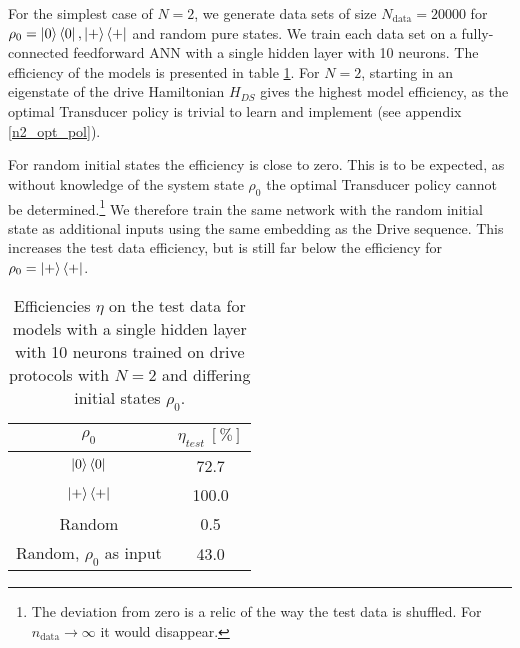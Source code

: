 For the simplest case of $N = 2$, we generate data sets of size $N_{\mathrm{data}} = 20000$ for $\rho_0 = \ket{0} \bra{0}, \ket{+} \bra{+}$ and random pure states.
We train each data set on a fully-connected feedforward ANN with a single hidden layer with 10 neurons.
The efficiency of the models is presented in table \ref{n2efftable}.
For $N = 2$, starting in an eigenstate of the drive Hamiltonian $H_{DS}$ gives the highest model efficiency, as the optimal Transducer policy is trivial to learn and implement (see appendix \ref{n2_opt_pol}).

For random initial states the efficiency is close to zero.
This is to be expected, as without knowledge of the system state $\rho_0$ the optimal Transducer policy cannot be determined.\footnote{The deviation from zero is a relic of the way the test data is shuffled. For $n_{\mathrm{data}} \to \infty$ it would disappear.}
We therefore train the same network with the random initial state as additional inputs using the same embedding as the Drive sequence.
This increases the test data efficiency, but is still far below the efficiency for $\rho_0 = \ket{+} \bra{+}$.


\begin{table}[h]
	\centering
	\begin{tabular}{ c | c }
		$\rho_0$ & $\eta_{test} \ [\%]$ \\
		\hline
		$\ket{0} \bra{0}$ & 72.7 \\
		$\ket{+} \bra{+}$ & 100.0 \\
		Random & 0.5 \\
		Random, $\rho_0$ as input & 43.0 \\
	\end{tabular}
	\caption{Efficiencies $\eta$ on the test data for models with a single hidden layer with 10 neurons trained on drive protocols with $N = 2$ and differing initial states $\rho_0$.}
	\label{n2efftable}
\end{table}